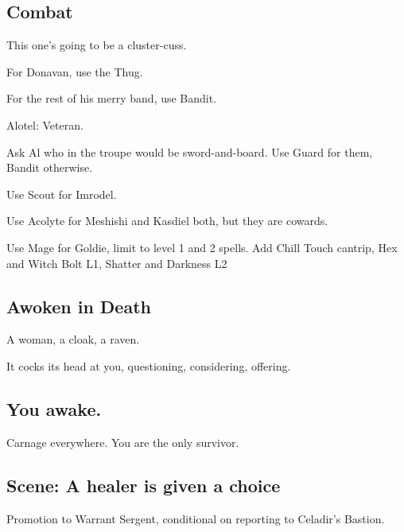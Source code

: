 \begin{multicols}{2}
\subsection{Combat}

This one's going to be a cluster-cuss.

For Donavan, use the Thug.

For the rest of his merry band, use Bandit.

Alotel: Veteran.

Ask Al who in the troupe would be sword-and-board.
Use Guard for them, Bandit otherwise.

Use Scout for Imrodel.

Use Acolyte for Meshishi and Kasdiel both, but they are cowards.

Use Mage for Goldie, limit to level 1 and 2 spells.
Add Chill Touch cantrip, Hex and Witch Bolt L1, Shatter and Darkness L2

\subsection{Awoken in Death}

A woman, a cloak, a raven.

It cocks its head at you, questioning, considering, offering.

\subsection{You awake.}

Carnage everywhere.
You are the only survivor.

\subsection{Scene: A healer is given a choice}

Promotion to Warrant Sergent, conditional on reporting to Celadir's Bastion.

\end{multicols}
